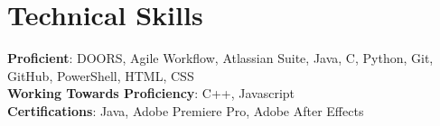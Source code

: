 \documentclass[letterpaper,11pt]{article}
\begin{document}
\section{Technical Skills}
 \begin{itemize}[leftmargin=0.15in, label={}]
    \small{\item{
     \textbf{Proficient}{: DOORS, Agile Workflow, Atlassian Suite, Java, C, Python, Git, GitHub, PowerShell, HTML, CSS} \\
     \textbf{Working Towards Proficiency}{: C++, Javascript} \\
     \textbf{Certifications}{: Java, Adobe Premiere Pro, Adobe After Effects}
    }}
 \end{itemize}

\end{document}
